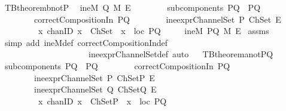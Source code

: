 \begin{isabellebody}
\ TBtheorem{}b{\isacharunderscore}notP{}{\isacharcolon}\isanewline
{}\ {\isachardoublequoteopen}{\isasymnot}\ ineM\ Q\ M\ E{\isachardoublequoteclose}\isanewline
\ \ \ \ \ \ \ \ {\isachardoublequoteopen}subcomponents\ PQ\ {\isacharequal}\ {\isacharbraceleft}P{\isacharcomma}Q{\isacharbraceright}{\isachardoublequoteclose}\isanewline
\ \ \ \ \ \ \ \ {\isachardoublequoteopen}correctCompositionIn\ PQ{\isachardoublequoteclose}\isanewline
\ \ \ \ \ \ \ \ {\isachardoublequoteopen}ine{\isacharunderscore}exprChannelSet\ P\ ChSet\ E{\isachardoublequoteclose}\isanewline
\ \ \ \ \ \ \ \ {\isachardoublequoteopen}{\isasymforall}\ {\isacharparenleft}x\ {\isacharcolon}{\isacharcolon}chanID{\isacharparenright}{\isachardot}\ {\isacharparenleft}{\isacharparenleft}x\ {\isasymin}\ ChSet{\isacharparenright}\ {\isasymlongrightarrow}\ {\isacharparenleft}x\ {\isasymin}\ {\isacharparenleft}loc\ PQ{\isacharparenright}{\isacharparenright}{\isacharparenright}{\isachardoublequoteclose}\isanewline
{}\ \ \ \ {\isachardoublequoteopen}{\isasymnot}\ ineM\ PQ\ M\ E{\isachardoublequoteclose}\isanewline
%
\isadelimproof
%
\endisadelimproof
%
\isatagproof
{}\isamarkupfalse%
\ assms\ \isanewline
{}\isamarkupfalse%
\ {\isacharparenleft}simp\ add{\isacharcolon}\ ineM{\isacharunderscore}def\ correctCompositionIn{\isacharunderscore}def\ \isanewline
\ \ \ \ \ \ \ \ \ \ \ \ \ \ \ \ \ \ \ \ \ ine{\isacharunderscore}exprChannelSet{\isacharunderscore}def{\isacharcomma}\ auto{\isacharparenright}%
\endisatagproof
{\isafoldproof}%
%
\isadelimproof
\ \isanewline
%
\endisadelimproof
\isanewline
{}\isamarkupfalse%
\ TBtheorem{}a{\isacharunderscore}notPQ{\isacharcolon}\isanewline
{}\ {\isachardoublequoteopen}subcomponents\ PQ\ {\isacharequal}\ {\isacharbraceleft}P{\isacharcomma}Q{\isacharbraceright}{\isachardoublequoteclose}\isanewline
\ \ \ \ \ \ \ \ {\isachardoublequoteopen}correctCompositionIn\ PQ{\isachardoublequoteclose}\isanewline
\ \ \ \ \ \ \ \ {\isachardoublequoteopen}ine{\isacharunderscore}exprChannelSet\ P\ ChSetP\ E{\isachardoublequoteclose}\isanewline
\ \ \ \ \ \ \ \ {\isachardoublequoteopen}ine{\isacharunderscore}exprChannelSet\ Q\ ChSetQ\ E{\isachardoublequoteclose}\isanewline
\ \ \ \ \ \ \ \ {\isachardoublequoteopen}{\isasymforall}\ {\isacharparenleft}x\ {\isacharcolon}{\isacharcolon}chanID{\isacharparenright}{\isachardot}\ {\isacharparenleft}{\isacharparenleft}x\ {\isasymin}\ ChSetP{\isacharparenright}\ {\isasymlongrightarrow}\ {\isacharparenleft}x\ {\isasymin}\ {\isacharparenleft}loc\ PQ{\isacharparenright}{\isacharparenright}{\isacharparenright}{\isachardoublequoteclose}\isanewline

\end{isabellebody}
